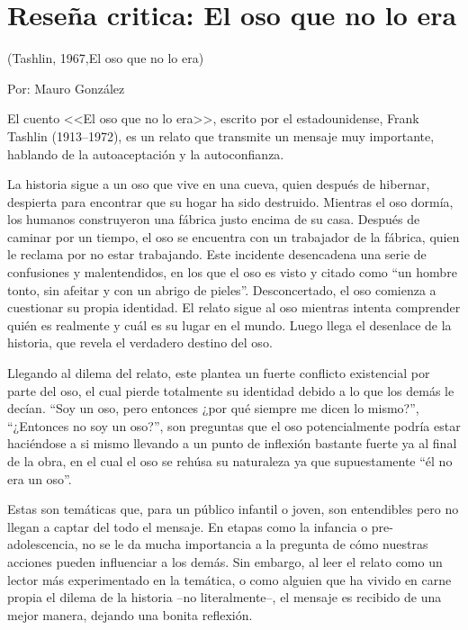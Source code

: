 \documentclass[letterpaper, 12pt]{report}
\begin{document}

\chapter*{Reseña critica: El oso que no lo era}


 (Tashlin, 1967,El oso que no lo era)

\nocite{FrankTashlin}

\noindent\makebox[\linewidth]{\rule{\textwidth}{0.4pt}}

Por: Mauro González

\noindent\makebox[\linewidth]{\rule{\textwidth}{0.4pt}}

\vspace{1cm}

El cuento <<El oso que no lo era>>, escrito por el
estadounidense, Frank Tashlin (1913--1972), es un relato
que transmite un mensaje muy importante, hablando de la
autoaceptación y la autoconfianza.

La historia sigue a un oso que vive en una cueva, quien
después de hibernar, despierta para encontrar que su hogar
ha sido destruido. Mientras el oso dormía, los humanos
construyeron una fábrica justo encima de su casa. Después
de caminar por un tiempo, el oso se encuentra con un
trabajador de la fábrica, quien le reclama por no estar
trabajando. Este incidente desencadena una serie de
confusiones y malentendidos, en los que el oso es visto y
citado como ``un hombre tonto, sin afeitar y con un abrigo
de pieles''. Desconcertado, el oso comienza a cuestionar su
propia identidad. El relato sigue al oso mientras intenta
comprender quién es realmente y cuál es su lugar en el
mundo. Luego llega el desenlace de la historia, que revela
el verdadero destino del oso.

Llegando al dilema del relato, este plantea un fuerte
conflicto existencial por parte del oso, el cual pierde
totalmente su identidad debido a lo que los demás le
decían. ``Soy un oso, pero entonces ¿por qué siempre me
dicen lo mismo?'', ``¿Entonces no soy un oso?'', son
preguntas que el oso potencialmente podría estar haciéndose
a si mismo llevando a un punto de inflexión bastante fuerte
ya al final de la obra, en el cual el oso se rehúsa su
naturaleza ya que supuestamente ``él no era un oso''.

Estas son temáticas que, para un público infantil o joven,
son entendibles pero no llegan a captar del todo el
mensaje. En etapas como la infancia o pre-adolescencia, no
se le da mucha importancia a la pregunta de cómo nuestras
acciones pueden influenciar a los demás. Sin embargo, al
leer el relato como un lector más experimentado en la
temática, o como alguien que ha vivido en carne propia el
dilema de la historia --no literalmente--, el mensaje es
recibido de una mejor manera, dejando una bonita reflexión.
\end{document}
